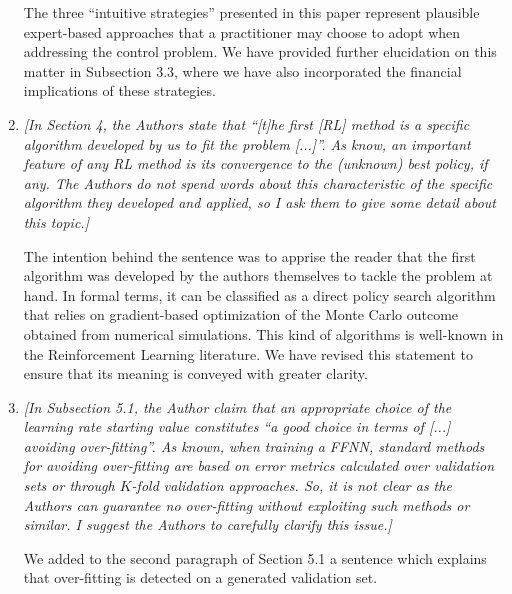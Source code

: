 \documentclass{article}
\newcommand{\quotations}[1]{``#1''}
\begin{document}
\begin{enumerate}
 The three \quotations{intuitive strategies} presented in this paper represent plausible expert-based approaches that a practitioner may choose to adopt when addressing the control problem. We have provided further elucidation on this matter in Subsection 3.3, where we have also incorporated the financial implications of these strategies.
 
 \item \textit{[In Section 4, the Authors state that ``[t]he first [RL] method is a specific algorithm developed by us to fit the problem [...]''. As know, an important feature of any RL method is its convergence to the (unknown) best policy, if any. The Authors do not spend words about this characteristic of the specific algorithm they developed and applied, so I ask them to give some detail about this topic.]} 
 
 The intention behind the sentence was to apprise the reader that the first algorithm was developed by the authors themselves to tackle the problem at hand. In formal terms, it can be classified as a direct policy search algorithm that relies on gradient-based optimization of the Monte Carlo outcome obtained from numerical simulations. This kind of algorithms is well-known in the Reinforcement Learning literature. We have revised this statement to ensure that its meaning is conveyed with greater clarity. 

 \item \textit{[In Subsection 5.1, the Author claim that an appropriate choice of the learning rate starting value constitutes ``a good choice in terms of [...] avoiding over-fitting''. As known, when training a FFNN, standard methods for avoiding over-fitting are based on error metrics calculated over validation sets or through $K$-fold validation approaches. So, it is not clear as the Authors can guarantee no over-fitting without exploiting such methods or similar. I suggest the Authors to carefully clarify this issue.]} 
 
We added to the second paragraph of Section 5.1 a sentence which explains that over-fitting is detected on a generated validation set.

 \end{enumerate}
\end{document}
